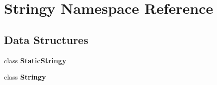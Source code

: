 \section{Stringy Namespace Reference}
\label{namespace_stringy}
\subsection*{Data Structures}
\begin{DoxyCompactItemize}
\item 
class {\bf Static\+Stringy}
\item 
class {\bf Stringy}
\end{DoxyCompactItemize}

